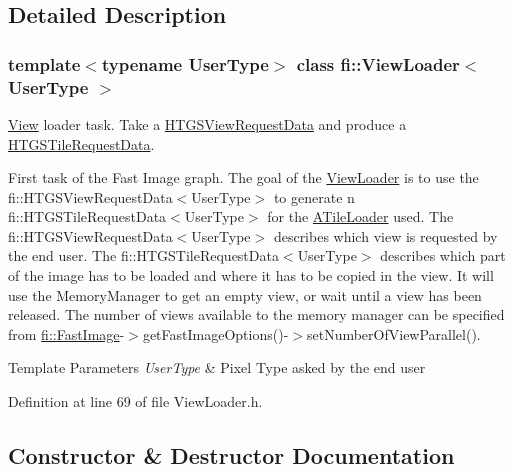 \subsection{Detailed Description}
\subsubsection*{template$<$typename User\+Type$>$\newline
class fi\+::\+View\+Loader$<$ User\+Type $>$}

\hyperlink{classfi_1_1View}{View} loader task. Take a \hyperlink{classfi_1_1HTGSViewRequestData}{H\+T\+G\+S\+View\+Request\+Data} and produce a \hyperlink{classfi_1_1HTGSTileRequestData}{H\+T\+G\+S\+Tile\+Request\+Data}. 

First task of the Fast Image graph. The goal of the \hyperlink{classfi_1_1ViewLoader}{View\+Loader} is to use the fi\+::\+H\+T\+G\+S\+View\+Request\+Data$<$\+User\+Type$>$ to generate n fi\+::\+H\+T\+G\+S\+Tile\+Request\+Data$<$\+User\+Type$>$ for the \hyperlink{classfi_1_1ATileLoader}{A\+Tile\+Loader} used. The fi\+::\+H\+T\+G\+S\+View\+Request\+Data$<$\+User\+Type$>$ describes which view is requested by the end user. The fi\+::\+H\+T\+G\+S\+Tile\+Request\+Data$<$\+User\+Type$>$ describes which part of the image has to be loaded and where it has to be copied in the view. It will use the Memory\+Manager to get an empty view, or wait until a view has been released. The number of views available to the memory manager can be specified from \hyperlink{classfi_1_1FastImage}{fi\+::\+Fast\+Image}-\/$>$get\+Fast\+Image\+Options()-\/$>$set\+Number\+Of\+View\+Parallel().


\begin{DoxyTemplParams}{Template Parameters}
{\em User\+Type} & Pixel Type asked by the end user \\
\hline
\end{DoxyTemplParams}


Definition at line 69 of file View\+Loader.\+h.



\subsection{Constructor \& Destructor Documentation}
\mbox{\label{classfi_1_1ViewLoader_ab026a286c497c820c495242122658af9}} 
